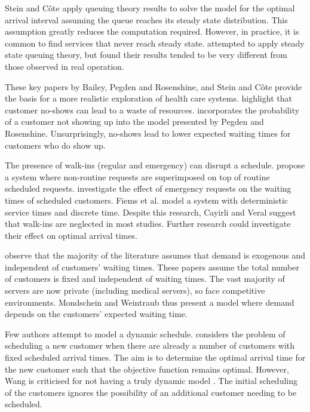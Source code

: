 Stein and C\^{o}te apply queuing theory results to solve the model for the optimal arrival interval assuming the queue reaches its steady state distribution. This assumption greatly reduces the computation required. However, in practice, it is common to find services that never reach steady state. \citet{Babes} attempted to apply steady state queuing theory, but found their results tended to be very different from those observed in real operation.

These key papers by Bailey, Pegden and Rosenshine, and Stein and C\^{o}te provide the basis for a more realistic exploration of health care systems. \citet{Delaurentis} highlight that customer no-shows can lead to a waste of resources. \citet{Mendel} incorporates the probability of a customer not showing up into the model presented by Pegden and Rosenshine. Unsurprisingly, no-shows lead to lower expected waiting times for customers who do show up.

The presence of walk-ins (regular and emergency) can disrupt a schedule. \citet{Gupta} propose a system where non-routine requests are superimposed on top of routine scheduled requests. \citet{Fiems} investigate the effect of emergency requests on the waiting times of scheduled customers. Fiems et al. model a system with deterministic service times and discrete time. Despite this research, Cayirli and Veral suggest that walk-ins are neglected in most studies. Further research could investigate their effect on optimal arrival times.

\citet{Mondschein} observe that the majority of the literature assumes that demand is exogenous and independent of customers' waiting times. These papers assume the total number of customers is fixed and independent of waiting times. The vast majority of servers are now private (including medical servers), so face competitive environments. Mondschein and Weintraub thus present a model where demand depends on the customers' expected waiting time.

Few authors attempt to model a dynamic schedule. \citet{Wang} considers the problem of scheduling a new customer when there are already a number of customers with fixed scheduled arrival times. The aim is to determine the optimal arrival time for the new customer such that the objective function remains optimal. However, Wang is criticised for not having a truly dynamic model \citep{Erdogan}. The initial scheduling of the customers ignores the possibility of an additional customer needing to be scheduled.

